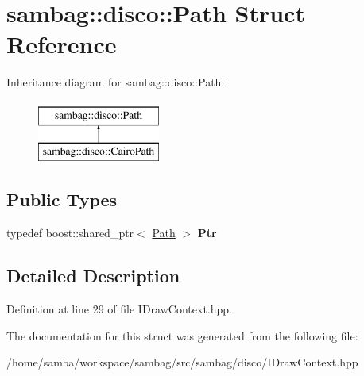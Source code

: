 \hypertarget{structsambag_1_1disco_1_1_path}{
\section{sambag::disco::Path Struct Reference}
\label{structsambag_1_1disco_1_1_path}
}
Inheritance diagram for sambag::disco::Path:\begin{figure}[H]
\begin{center}
\leavevmode
\includegraphics[height=2.000000cm]{structsambag_1_1disco_1_1_path}
\end{center}
\end{figure}
\subsection*{Public Types}
\begin{DoxyCompactItemize}
\item 
\hypertarget{structsambag_1_1disco_1_1_path_af11e0e5de8630a092da4a2d1d7f10c24}{
typedef boost::shared\_\-ptr$<$ \hyperlink{structsambag_1_1disco_1_1_path}{Path} $>$ {\bfseries Ptr}}
\label{structsambag_1_1disco_1_1_path_af11e0e5de8630a092da4a2d1d7f10c24}

\end{DoxyCompactItemize}


\subsection{Detailed Description}


Definition at line 29 of file IDrawContext.hpp.



The documentation for this struct was generated from the following file:\begin{DoxyCompactItemize}
\item 
/home/samba/workspace/sambag/src/sambag/disco/IDrawContext.hpp\end{DoxyCompactItemize}
